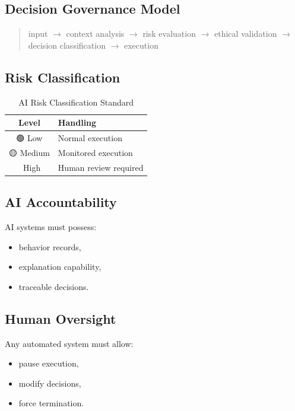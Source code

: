 \documentclass[conference]{IEEEtran}
\begin{document}
\subsection{Decision Governance Model}

\begin{quote}
input $\to$ context analysis $\to$ risk evaluation
$\to$ ethical validation $\to$ decision classification
$\to$ execution
\end{quote}

\subsection{Risk Classification}

\begin{table}[t]
\centering
\caption{AI Risk Classification Standard}
\label{tab:risklevels}
\renewcommand{\arraystretch}{1.2}
\begin{tabular}{cl}
\toprule
\textbf{Level} & \textbf{Handling} \\
\midrule
\textcolor{cnsGreen}{🟢 Low} & Normal execution \\
\textcolor{cnsGold}{🟡 Medium} & Monitored execution \\
\textcolor{cnsRed}{🔴 High} & Human review required \\
\bottomrule
\end{tabular}
\end{table}

\subsection{AI Accountability}

AI systems must possess:
\begin{itemize}[nosep]
  \item behavior records,
  \item explanation capability,
  \item traceable decisions.
\end{itemize}

\subsection{Human Oversight}

Any automated system must allow:
\begin{itemize}[nosep]
  \item pause execution,
  \item modify decisions,
  \item force termination.
\end{itemize}
\end{document}
